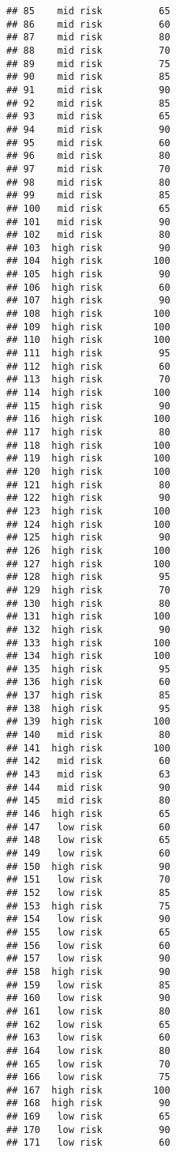 \documentclass[
  ignorenonframetext,
]{beamer}
\begin{document}
\begin{frame}[fragile]
\begin{verbatim}
## 85    mid risk          65
## 86    mid risk          60
## 87    mid risk          80
## 88    mid risk          70
## 89    mid risk          75
## 90    mid risk          85
## 91    mid risk          90
## 92    mid risk          85
## 93    mid risk          65
## 94    mid risk          90
## 95    mid risk          60
## 96    mid risk          80
## 97    mid risk          70
## 98    mid risk          80
## 99    mid risk          85
## 100   mid risk          65
## 101   mid risk          90
## 102   mid risk          80
## 103  high risk          90
## 104  high risk         100
## 105  high risk          90
## 106  high risk          60
## 107  high risk          90
## 108  high risk         100
## 109  high risk         100
## 110  high risk         100
## 111  high risk          95
## 112  high risk          60
## 113  high risk          70
## 114  high risk         100
## 115  high risk          90
## 116  high risk         100
## 117  high risk          80
## 118  high risk         100
## 119  high risk         100
## 120  high risk         100
## 121  high risk          80
## 122  high risk          90
## 123  high risk         100
## 124  high risk         100
## 125  high risk          90
## 126  high risk         100
## 127  high risk         100
## 128  high risk          95
## 129  high risk          70
## 130  high risk          80
## 131  high risk         100
## 132  high risk          90
## 133  high risk         100
## 134  high risk         100
## 135  high risk          95
## 136  high risk          60
## 137  high risk          85
## 138  high risk          95
## 139  high risk         100
## 140   mid risk          80
## 141  high risk         100
## 142   mid risk          60
## 143   mid risk          63
## 144   mid risk          90
## 145   mid risk          80
## 146  high risk          65
## 147   low risk          60
## 148   low risk          65
## 149   low risk          60
## 150  high risk          90
## 151   low risk          70
## 152   low risk          85
## 153  high risk          75
## 154   low risk          90
## 155   low risk          65
## 156   low risk          60
## 157   low risk          90
## 158  high risk          90
## 159   low risk          85
## 160   low risk          90
## 161   low risk          80
## 162   low risk          65
## 163   low risk          60
## 164   low risk          80
## 165   low risk          70
## 166   low risk          75
## 167  high risk         100
## 168  high risk          90
## 169   low risk          65
## 170   low risk          90
## 171   low risk          60

\end{verbatim}
\end{frame}
\end{document}
